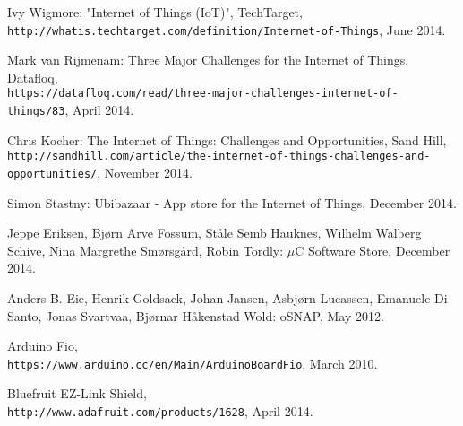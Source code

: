 \begin{thebibliography}{9}
Ivy Wigmore: "Internet of Things (IoT)", TechTarget,
\\\texttt{http://whatis.techtarget.com/definition/Internet-of-Things}, June 2014.

Mark van Rijmenam: Three Major Challenges for the Internet of Things, Datafloq, \\\texttt{https://datafloq.com/read/three-major-challenges-internet-of-things/83}, April 2014.

Chris Kocher: The Internet of Things: Challenges and Opportunities, Sand Hill, \\\texttt{http://sandhill.com/article/the-internet-of-things-challenges-and-opportunities/}, November 2014.

Simon Stastny: Ubibazaar - App store for the Internet of Things, December 2014.

Jeppe Eriksen, Bjørn Arve Fossum, Ståle Semb Hauknes, Wilhelm Walberg Schive, Nina Margrethe Smørsgård, Robin Tordly: \(\mu\)C Software Store, December 2014.

Anders B. Eie, Henrik Goldsack, Johan Jansen, Asbjørn Lucassen, Emanuele Di Santo, Jonas Svartvaa, Bjørnar Håkenstad Wold: oSNAP, May 2012.

Arduino Fio, \\\texttt{https://www.arduino.cc/en/Main/ArduinoBoardFio}, March 2010.

Bluefruit EZ-Link Shield, \\\texttt{http://www.adafruit.com/products/1628}, April 2014.

\end{thebibliography}